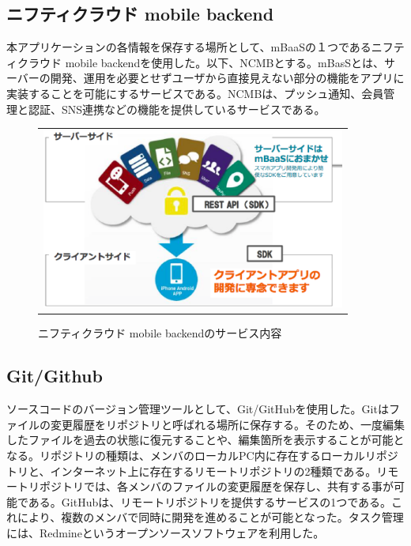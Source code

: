 \subsection{ニフティクラウド mobile backend}%
本アプリケーションの各情報を保存する場所として、mBaaSの１つであるニフティクラウド mobile backendを使用した。以下、NCMBとする。mBasSとは、サーバーの開発、運用を必要とせずユーザから直接見えない部分の機能をアプリに実装することを可能にするサービスである。NCMBは、プッシュ通知、会員管理と認証、SNS連携などの機能を提供しているサービスである。

\begin{figure}[htbp]
  \begin{center}
    \begin{tabular}{c}

      \begin{minipage}{0.7\hsize}
        \begin{center}
\includegraphics[width=10cm]{ncmb_overview.eps}
          \hspace{1cm} %
        \end{center}
      \end{minipage}

    \end{tabular}
    \caption{ニフティクラウド mobile backendのサービス内容}
    \label{fig:lena}
  \end{center}
\end{figure}


\subsection{Git/Github}%
ソースコードのバージョン管理ツールとして、Git/GitHubを使用した。Gitはファイルの変更履歴をリポジトリと呼ばれる場所に保存する。そのため、一度編集したファイルを過去の状態に復元することや、編集箇所を表示することが可能となる。リポジトリの種類は、メンバのローカルPC内に存在するローカルリポジトリと、インターネット上に存在するリモートリポジトリの2種類である。リモートリポジトリでは、各メンバのファイルの変更履歴を保存し、共有する事が可能である。GitHubは、リモートリポジトリを提供するサービスの1つである。これにより、複数のメンバで同時に開発を進めることが可能となった。タスク管理には、Redmineというオープンソースソフトウェアを利用した。


